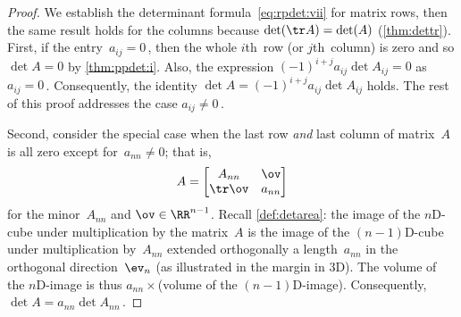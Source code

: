 \begin{proof} 
We establish the determinant formula~\eqref{eq:rpdet:vii} for matrix rows,  then the same result holds for the columns because \(\det(\tr A)=\det(A)\) (\autoref{thm:dettr}).
First, if the entry~\(a_{ij}=0\)\,, then the whole \(i\)th~row (or \(j\)th~column) is zero and so \(\det A=0\) by \autoref{thm:ppdet:i}.  
Also, the expression \((-1)^{i+j}a_{ij}\det A_{ij}=0\) as \(a_{ij}=0\)\,.  
Consequently, the identity \(\det A=(-1)^{i+j}a_{ij}\det A_{ij}\) holds.
The rest of this proof addresses the case \(a_{ij}\neq 0\)\,.

Second, consider the special case when the last row \emph{and} last column of matrix~\(A\) is all zero except for~\(a_{nn}\neq0\); that is, 
\begin{equation*}
A=\begin{bmatrix} A_{nn}&\ov\\\tr\ov&a_{nn} \end{bmatrix}
\end{equation*}
for the minor~\(A_{nn}\) and \(\ov\in\RR^{n-1}\).
Recall \autoref{def:detarea}: the image of the \(n\)D-cube under multiplication by the matrix~\(A\) is the image of the \((n-1)\)D-cube under multiplication by~\(A_{nn}\) extended orthogonally a length~\(a_{nn}\) in the orthogonal direction~\(\ev_n\) (as illustrated in the margin in 3D).
The volume of the \(n\)D-image is thus \(a_{nn}\times{}\)(volume of the \((n-1)\)D-image).
Consequently, \(\det A=a_{nn}\det A_{nn}\)\,.
\begin{comment}
The above glosses over details for when \(a_{nn}<0\).
\end{comment}


\end{proof}
